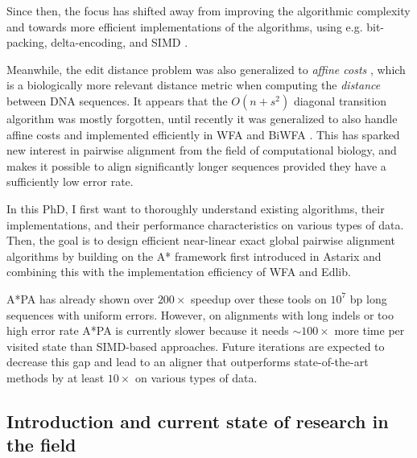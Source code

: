 \documentclass[11pt,english,a4paper]{article}
\begin{document}
Since then, the focus has shifted away from improving the algorithmic complexity
and towards more efficient implementations of the algorithms, using e.g.
bit-packing, delta-encoding, and SIMD
\autocite{myers99,edlib,difference-recurrence-relations}.

Meanwhile, the edit distance problem was also generalized to \emph{affine costs}
\autocite{gotoh}, which is a biologically more relevant distance metric when
computing the \emph{distance} between DNA sequences.
It appears that the \(O(n+s^2)\) diagonal transition algorithm was
mostly forgotten, until recently it was generalized to also handle affine costs
and implemented efficiently in WFA and BiWFA \autocite{wfa,biwfa}.
This has sparked new interest in pairwise alignment from the field of
computational biology, and makes it possible to align significantly longer
sequences provided they have a sufficiently low error rate.

In this PhD, I first want to thoroughly understand existing
algorithms, their implementations, and their performance characteristics on
various types of data.
Then, the goal is to design efficient near-linear exact global pairwise alignment
algorithms by building on the A* framework first introduced in Astarix
\autocite{astarix-1,astarix-2} and combining this with the implementation efficiency of
WFA and Edlib.

A*PA has already shown over \(200\times\) speedup over these tools on \(10^7\) bp
long sequences with uniform errors. However, on alignments with long indels or
too high error rate A*PA is currently slower because it needs \(\sim 100\times\)
more time per visited state than SIMD-based approaches. Future iterations are
expected to decrease this gap and lead to an aligner that outperforms
state-of-the-art methods by at least \(10\times\) on various types of data.

\subsection{Introduction and current state of research in the field}
\label{sec:orgecc00e2}
\end{document}
